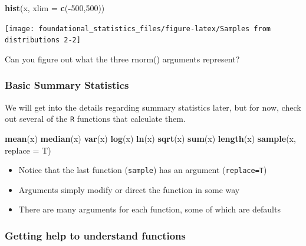 \documentclass[]{book}
\newenvironment{Shaded}{\begin{snugshade}}{\end{snugshade}}
\newcommand{\DataTypeTok}[1]{\textcolor[rgb]{0.13,0.29,0.53}{#1}}
\newcommand{\DecValTok}[1]{\textcolor[rgb]{0.00,0.00,0.81}{#1}}
\newcommand{\KeywordTok}[1]{\textcolor[rgb]{0.13,0.29,0.53}{\textbf{#1}}}
\newcommand{\NormalTok}[1]{#1}
\newcommand{\OperatorTok}[1]{\textcolor[rgb]{0.81,0.36,0.00}{\textbf{#1}}}
\begin{document}
\begin{Shaded}
\begin{Highlighting}[]
\KeywordTok{hist}\NormalTok{(x, }\DataTypeTok{xlim =} \KeywordTok{c}\NormalTok{(}\OperatorTok{-}\DecValTok{500}\NormalTok{,}\DecValTok{500}\NormalTok{))}
\end{Highlighting}
\end{Shaded}

\texttt{[image: foundational\_statistics\_files/figure-latex/Samples from distributions 2-2]}

Can you figure out what the three rnorm() arguments represent?

\hypertarget{basic-summary-statistics}{%
\subsubsection{Basic Summary Statistics}\label{basic-summary-statistics}}

We will get into the details regarding summary statistics later, but for now, check out several of the \texttt{R} functions that calculate them.

\begin{Shaded}
\begin{Highlighting}[]
\KeywordTok{mean}\NormalTok{(x)}
\KeywordTok{median}\NormalTok{(x)}
\KeywordTok{var}\NormalTok{(x)}
\KeywordTok{log}\NormalTok{(x)}
\KeywordTok{ln}\NormalTok{(x)}
\KeywordTok{sqrt}\NormalTok{(x)}
\KeywordTok{sum}\NormalTok{(x)}
\KeywordTok{length}\NormalTok{(x)}
\KeywordTok{sample}\NormalTok{(x, }\DataTypeTok{replace =}\NormalTok{ T)}
\end{Highlighting}
\end{Shaded}

\begin{itemize}
\item
  Notice that the last function (\texttt{sample}) has an argument (\texttt{replace=T})
\item
  Arguments simply modify or direct the function in some way
\item
  There are many arguments for each function, some of which are defaults
\end{itemize}

\hypertarget{getting-help-to-understand-functions}{%
\subsubsection{Getting help to understand functions}\label{getting-help-to-understand-functions}}
\end{document}
